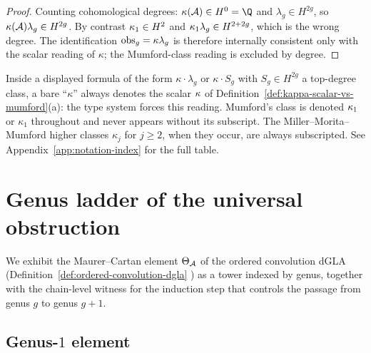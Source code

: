 \begin{proof}
Counting cohomological degrees: $\kscal(\cA)\in H^0=\Q$ and
$\lambda_g\in H^{2g}$, so $\kappa(\mathcal{A})\lambda_g\in H^{2g}$. By
contrast $\kappa_{1}\in H^{2}$ and $\kappa_{1}\lambda_g\in H^{2+2g}$, which is
the wrong degree. The identification
$\mathrm{obs}_g=\kappa\lambda_g$ is therefore internally consistent
only with the scalar reading of $\kappa$; the Mumford-class reading
is excluded by degree. \end{proof}

\begin{remark}
\label{rem:kappa-bare-convention}
Inside a displayed formula of the form $\kappa\cdot\lambda_g$ or
$\kappa\cdot S_g$ with $S_g\in H^{2g}$ a top-degree class, a bare
``$\kappa$'' always denotes the scalar $\kappa$ of
Definition~\ref{def:kappa-scalar-vs-mumford}(a): the type system
forces this reading. Mumford's class is denoted $\kappa_{1}$ or $\kappa_1$
throughout and never appears without its subscript. The
Miller--Morita--Mumford higher classes $\kappa_j$ for $j\geq 2$,
when they occur, are always subscripted. See
Appendix~\ref{app:notation-index} for the full table.
\end{remark}

\section{Genus ladder of the universal obstruction}
\label{sec:theta-A-genus-ladder}

We exhibit the Maurer--Cartan element $\Theta_{\mathcal{A}}$ of the
ordered convolution dGLA
\textup{(}Definition~\textup{\ref{def:ordered-convolution-dgla}}%
\textup{)} as a tower indexed by genus, together with the chain-level
witness for the induction step that controls the passage from genus
$g$ to genus $g+1$.

\subsection{Genus-$1$ element}
\label{subsec:theta-A-g1}


